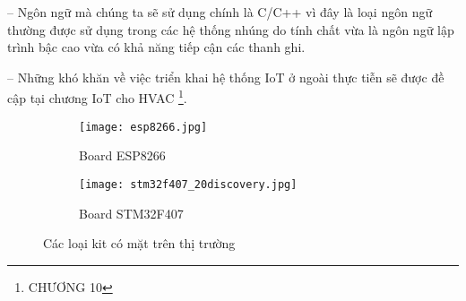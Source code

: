 	-- Ngôn ngữ mà chúng ta sẽ sử dụng chính là C/C++ vì đây là loại ngôn ngữ thường được sử dụng trong các hệ thống nhúng do tính chất vừa là ngôn ngữ lập trình bậc cao vừa có khả năng tiếp cận các thanh ghi. 
	
	-- Những khó khăn về việc triển khai hệ thống IoT ở ngoài thực tiễn sẽ được đề cập tại chương IoT cho HVAC \footnote{CHƯƠNG 10}.

\begin{figure}[H]
\begin{subfigure}{0.5\textwidth}
\begin{center}
	\texttt{[image: esp8266.jpg]} 
	\caption{Board ESP8266}
\end{center}
\end{subfigure}
\begin{subfigure}{0.5\textwidth}
\begin{center}
		\texttt{[image: stm32f407\_20discovery.jpg]}
	\caption{Board STM32F407}
\end{center}
\end{subfigure}
\caption{Các loại kit có mặt trên thị trường}	
\end{figure}

	